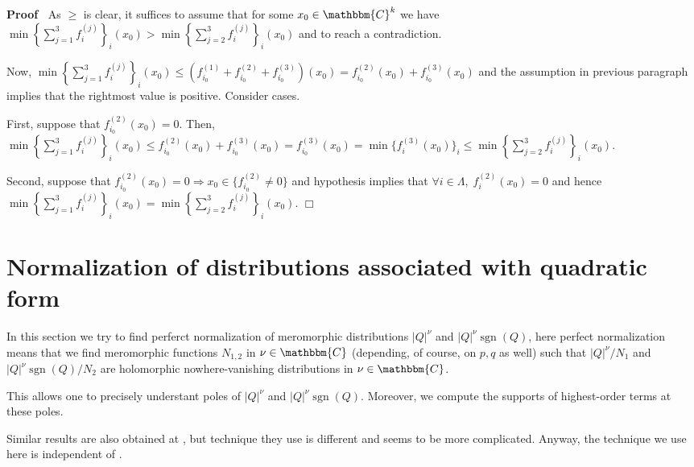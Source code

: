 \documentclass{article}
\newcommand{\tmop}[1]{\ensuremath{\operatorname{#1}}}
\newenvironment{proof}{\noindent\textbf{Proof\ }}{\hspace*{\fill}$\Box$\medskip}
\numberwithin{definition}{section}
\numberwithin{lemma}{section}
\numberwithin{proposition}{section}
{\theorembodyfont{\rmfamily}\newtheorem{remark}{Remark}
\numberwithin{remark}{section}
}
\begin{document}
\begin{proof}
  As $\geqslant$ is clear, it suffices to assume that for some $x_0 \in
  \mathbbm{C}^k$ we have $\min \left\{ \sum_{j = 1}^3 f^{( j)}_i \right\}_i (
  x_0) > \min \left\{ \sum_{j = 2}^3 f^{( j)}_i \right\}_i ( x_0)$ and to
  reach a contradiction.
  
  Now, $\min \left\{ \sum_{j = 1}^3 f^{( j)}_i \right\}_i ( x_0) \leqslant (
  f_{i_0}^{( 1)} + f_{i_0}^{( 2)} + f_{i_0}^{( 3)}) ( x_0) = f_{i_0}^{( 2)} (
  x_0) + f_{i_0}^{( 3)} ( x_0)$ and the assumption in previous paragraph
  implies that the rightmost value is positive. Consider cases.
  
  First, suppose that $f_{i_0}^{( 2)} ( x_0) = 0$. Then, $\min \left\{ \sum_{j
  = 1}^3 f^{( j)}_i \right\}_i ( x_0) \leqslant f_{i_0}^{( 2)} ( x_0) +
  f_{i_0}^{( 3)} ( x_0) = f^{( 3)}_{i_0} ( x_0) = \min \{ f^{( 3)}_{i_{}} (
  x_0) \}_i \leqslant \min \left\{ \sum_{j = 2}^3 f^{( j)}_i \right\}_i (
  x_0)$.
  
  Second, suppose that $f_{i_0}^{( 2)} ( x_0) = 0 \Rightarrow x_0 \in \{
  f_{i_0}^{( 2)} \neq 0 \}$ and hypothesis implies that $\forall i \in
  \Lambda, \; f_i^{( 2)} ( x_0) = 0$ and hence $\min \left\{ \sum_{j = 1}^3
  f^{( j)}_i \right\}_i ( x_0) = \min \left\{ \sum_{j = 2}^3 f_i^{( j)}
  \right\}_i ( x_0)$.
\end{proof}



\section{Normalization of distributions associated with quadratic
form}\label{section:q-norm}

In this section we try to find perferct normalization of meromorphic
distributions $| Q |^{\nu}$ and $| Q |^{\nu} \tmop{sgn} ( Q)$, here perfect
normalization means that we find meromorphic functions $N_{1, 2}$ in $\nu \in
\mathbbm{C}$ (depending, of course, on $p, q$ as well) such that $| Q |^{\nu}
/ N_1$ and $| Q |^{\nu} \tmop{sgn} ( Q) / N_2$ are holomorphic
nowhere-vanishing distributions in $\nu \in \mathbbm{C}$.

This allows one to precisely understant poles of $| Q |^{\nu}$ and $| Q
|^{\nu} \tmop{sgn} ( Q)$. Moreover, we compute the supports of highest-order
terms at these poles.

Similar results are also obtained at {\cite{gelfand1980distribution}}, but
technique they use is different and seems to be more complicated. Anyway, the
technique we use here is independent of {\cite{gelfand1980distribution}}.
\end{document}
